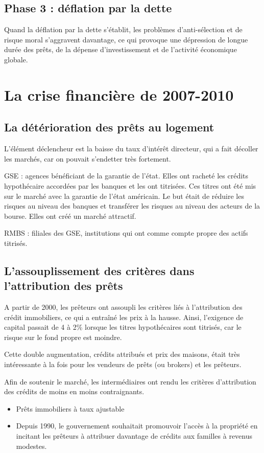 	\subsection{Phase 3 : déflation par la dette}
	
	Quand la déflation par la dette s'établit, les problèmes d'anti-sélection et de 
risque moral s'aggravent davantage, ce qui provoque une dépression de 
longue durée des prêts, de la dépense d'investissement et de l'activité économique globale. 


\section{La crise financière de 2007-2010}

	\subsection{La détérioration des prêts au logement}
	
	L'élément déclencheur est la baisse du taux d'intérêt directeur, qui a fait décoller les marchés, car on pouvait s'endetter très fortement.
	
	GSE : agences bénéficiant de la garantie de l'état. Elles ont racheté les crédits hypothécaire accordées par les banques et les ont titrisées. Ces titres ont été mis sur le marché avec la garantie de l'état américain. Le but était de réduire les risques au niveau des banques et transférer les risques au niveau des acteurs de la bourse. Elles ont créé un marché attractif.
	
	RMBS : filiales des GSE, institutions qui ont comme compte propre des actifs titrisés.
	
	\subsection{L'assouplissement des critères dans l'attribution des prêts}
	
	A partir de 2000, les prêteurs ont assoupli les critères liés à l'attribution des crédit immobiliers, ce qui a entraîné les prix à la hausse. Ainsi, l'exigence de capital passait de 4 à 2\% lorsque les titres hypothécaires sont titrisés, car le risque sur le fond propre est moindre.

	Cette double augmentation, crédits attribués et prix des maisons, était très intéressante à la fois pour les vendeurs de prêts (ou brokers) et les prêteurs. 

Afin de soutenir le marché, les intermédiaires ont rendu les critères 
d'attribution des crédits de moins en moins contraignants. 
\begin{itemize}
	\item Prêts immobiliers à taux ajustable 
	\item Depuis 1990, le gouvernement souhaitait promouvoir l'accès à la propriété en incitant les prêteurs à attribuer davantage de crédits aux familles à revenus modestes.
\end{itemize}

